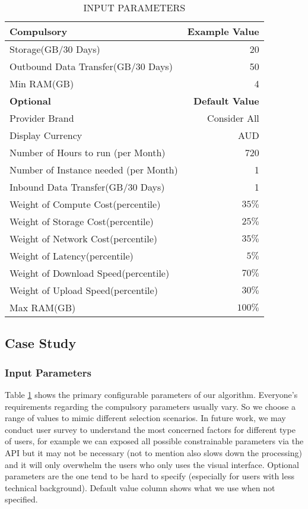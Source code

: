 \documentclass[journal]{IEEEtran}
\begin{document}
\begin{table}[!h]
\begin{center}\caption{INPUT PARAMETERS } \label{table:input_param}
\begin{tabular}{|l|r|}
\hline
\textbf{Compulsory }&  \textbf{Example Value } \\
\hline Storage(GB/30 Days) & 20 \\
\hline Outbound Data Transfer(GB/30 Days) & 50 \\
\hline Min RAM(GB) & 4 \\
\hline \textbf{Optional } & \textbf{Default Value} \\
\hline Provider Brand & Consider All \\
\hline Display Currency  & AUD \\

\hline Number of Hours to run (per Month) & 720 \\
\hline Number of Instance needed (per Month) & 1 \\
\hline Inbound Data Transfer(GB/30 Days) & 1  \\
\hline Weight of Compute Cost(percentile) & $35\%$ \\
\hline Weight of Storage Cost(percentile) & $25\%$ \\
\hline Weight of Network Cost(percentile) &  $35\%$\\
\hline Weight of Latency(percentile) & $5\%$ \\
\hline Weight of Download Speed(percentile) & $70\%$ \\
\hline Weight of Upload Speed(percentile) & $30\%$ \\
\hline Max RAM(GB) & $100\%$ \\

\hline
\end{tabular}
\end{center}
\end{table}

\subsection{Case Study}
\subsubsection{ Input Parameters}
Table \ref{table:input_param} shows the primary configurable parameters of our algorithm. Everyone's requirements regarding the compulsory parameters usually vary. So we choose a range of values to mimic different selection scenarios. In future work, we may conduct user survey to understand the most concerned factors for different type of users, for example we can exposed all possible constrainable parameters via the API but it may not be necessary (not to mention also slows down the processing) and it will only overwhelm the users who only uses the visual interface. Optional parameters are the one tend to be hard to specify (especially for users with less technical background). Default value column shows what we use when not specified.
\end{document}
